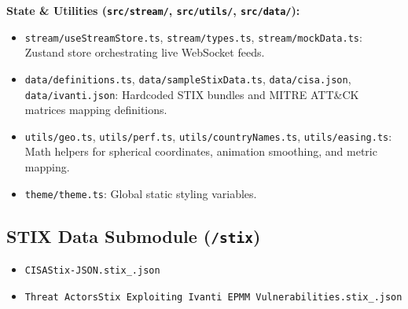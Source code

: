 \documentclass[12pt,a4paper]{article}
\begin{document}
\textbf{State \& Utilities (\texttt{src/stream/}, \texttt{src/utils/}, \texttt{src/data/}):}
\begin{itemize}[noitemsep]
    \item \verb|stream/useStreamStore.ts|, \verb|stream/types.ts|, \verb|stream/mockData.ts|: Zustand store orchestrating live WebSocket feeds.
    \item \verb|data/definitions.ts|, \verb|data/sampleStixData.ts|, \verb|data/cisa.json|, \verb|data/ivanti.json|: Hardcoded STIX bundles and MITRE ATT\&CK matrices mapping definitions.
    \item \verb|utils/geo.ts|, \verb|utils/perf.ts|, \verb|utils/countryNames.ts|, \verb|utils/easing.ts|: Math helpers for spherical coordinates, animation smoothing, and metric mapping.
    \item \verb|theme/theme.ts|: Global static styling variables.
\end{itemize}

\subsection{STIX Data Submodule (\texttt{/stix})}
\begin{itemize}[noitemsep]
    \item \verb|CISAStix-JSON.stix_.json|
    \item \verb|Threat ActorsStix Exploiting Ivanti EPMM Vulnerabilities.stix_.json|
\end{itemize}
\end{document}
